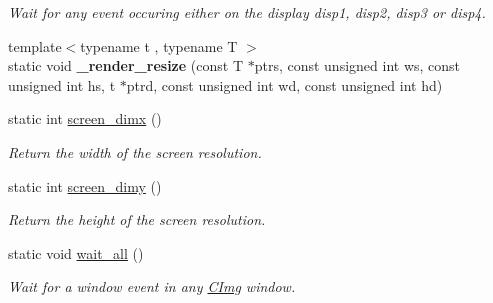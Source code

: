 \begin{DoxyCompactItemize}
\begin{DoxyCompactList}\small\item\em Wait for any event occuring either on the display {\ttfamily disp1}, {\ttfamily disp2}, {\ttfamily disp3} or {\ttfamily disp4}. \item\end{DoxyCompactList}\item 
\hypertarget{structcimg__library_1_1_c_img_display_ab7a83f56ff0b3b6363463befae1f397e}{
{\footnotesize template$<$typename t , typename T $>$ }\\static void {\bfseries \_\-render\_\-resize} (const T $\ast$ptrs, const unsigned int ws, const unsigned int hs, t $\ast$ptrd, const unsigned int wd, const unsigned int hd)}
\label{structcimg__library_1_1_c_img_display_ab7a83f56ff0b3b6363463befae1f397e}

\item 
\hypertarget{structcimg__library_1_1_c_img_display_a8365439b21d8cdf9624b2f208b563e83}{
static int \hyperlink{structcimg__library_1_1_c_img_display_a8365439b21d8cdf9624b2f208b563e83}{screen\_\-dimx} ()}
\label{structcimg__library_1_1_c_img_display_a8365439b21d8cdf9624b2f208b563e83}

\begin{DoxyCompactList}\small\item\em Return the width of the screen resolution. \item\end{DoxyCompactList}\item 
\hypertarget{structcimg__library_1_1_c_img_display_ac8b1cad117a01ad3d939892d1314e0d7}{
static int \hyperlink{structcimg__library_1_1_c_img_display_ac8b1cad117a01ad3d939892d1314e0d7}{screen\_\-dimy} ()}
\label{structcimg__library_1_1_c_img_display_ac8b1cad117a01ad3d939892d1314e0d7}

\begin{DoxyCompactList}\small\item\em Return the height of the screen resolution. \item\end{DoxyCompactList}\item 
\hypertarget{structcimg__library_1_1_c_img_display_a928bdc29039ee9369d3b38370f7b0f92}{
static void \hyperlink{structcimg__library_1_1_c_img_display_a928bdc29039ee9369d3b38370f7b0f92}{wait\_\-all} ()}
\label{structcimg__library_1_1_c_img_display_a928bdc29039ee9369d3b38370f7b0f92}

\begin{DoxyCompactList}\small\item\em Wait for a window event in any \hyperlink{structcimg__library_1_1_c_img}{CImg} window. \item\end{DoxyCompactList}\end{DoxyCompactItemize}

